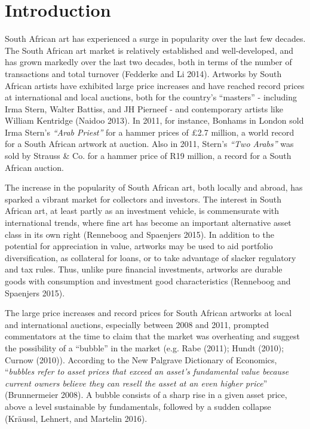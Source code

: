 \documentclass[]{elsarticle} %
\begin{document}
\section{Introduction}\label{introduction}

South African art has experienced a surge in popularity over the last
few decades. The South African art market is relatively established and
well-developed, and has grown markedly over the last two decades, both
in terms of the number of transactions and total turnover (Fedderke and
Li 2014). Artworks by South African artists have exhibited large price
increases and have reached record prices at international and local
auctions, both for the country's ``masters'' - including Irma Stern,
Walter Battiss, and JH Pierneef - and contemporary artists like William
Kentridge (Naidoo 2013). In 2011, for instance, Bonhams in London sold
Irma Stern's \emph{``Arab Priest''} for a hammer prices of £2.7 million,
a world record for a South African artwork at auction. Also in 2011,
Stern's \emph{``Two Arabs''} was sold by Strauss \& Co. for a hammer
price of R19 million, a record for a South African auction.

The increase in the popularity of South African art, both locally and
abroad, has sparked a vibrant market for collectors and investors. The
interest in South African art, at least partly as an investment vehicle,
is commensurate with international trends, where fine art has become an
important alternative asset class in its own right (Renneboog and
Spaenjers 2015). In addition to the potential for appreciation in value,
artworks may be used to aid portfolio diversification, as collateral for
loans, or to take advantage of slacker regulatory and tax rules. Thus,
unlike pure financial investments, artworks are durable goods with
consumption and investment good characteristics (Renneboog and Spaenjers
2015).

The large price increases and record prices for South African artworks
at local and international auctions, especially between 2008 and 2011,
prompted commentators at the time to claim that the market was
overheating and suggest the possibility of a ``bubble'' in the market
(e.g. Rabe (2011); Hundt (2010); Curnow (2010)). According to the New
Palgrave Dictionary of Economics, ``\emph{bubbles refer to asset prices
that exceed an asset's fundamental value because current owners believe
they can resell the asset at an even higher price}'' (Brunnermeier
2008). A bubble consists of a sharp rise in a given asset price, above a
level sustainable by fundamentals, followed by a sudden collapse
(Kräussl, Lehnert, and Martelin 2016).
\end{document}
